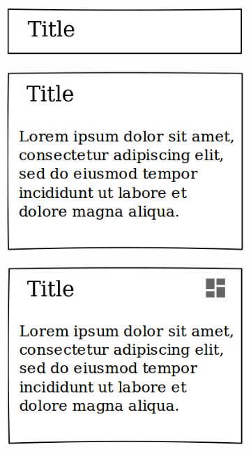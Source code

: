 \documentclass{sigchi}
\begin{document}
\begin{figure}
	\centering
	\begin{subfigure}{0.4\columnwidth}
		\includegraphics[width=\textwidth]{figures/widget-titleonly}
		\caption{}
		\label{fig:widget-titleonly}
	\end{subfigure}%
	\hfill
	\begin{subfigure}{0.4\columnwidth}
		\includegraphics[width=\textwidth]{figures/widget-default-docked}
		\caption{}
		\label{fig:widget-default-docked}
	\end{subfigure}
	\hfill
	\begin{subfigure}{0.4\columnwidth}
		\includegraphics[width=\textwidth]{figures/widget-default-undocked}

\end{subfigure}
\end{figure}
\end{document}
